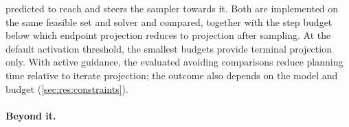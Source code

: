 \begin{enumerate}
    predicted to reach and steers the sampler towards it. Both are implemented on the same feasible set
    and solver and compared, together with the step budget below which endpoint projection reduces to
    projection after sampling. At the default activation threshold, the smallest budgets provide
    terminal projection only. With active guidance, the evaluated avoiding comparisons reduce
    planning time relative to iterate projection; the outcome also depends on the model and budget
    (\autoref{sec:res:constraints}).
\end{enumerate}

\paragraph{Beyond it.}
